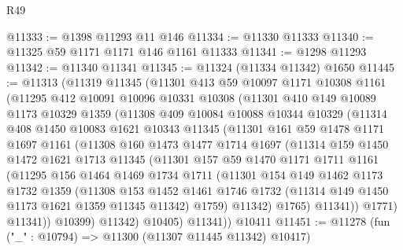 \begin{lexlean}{R49}
\begin{coremodule}
@11333 := @1398 @11293 @11 @146
@11334 := @11330 @11333
@11340 := @11325 @59 @1171 @1171 @146 @1161 @11333
@11341 := @1298 @11293
@11342 := @11340 @11341
@11345 := @11324 (@11334 @11342) @1650
@11445 := @11313
    (@11319
      @11345
      (@11301
        @413
        @59
        @10097
        @1171
        @10308
        @1161
        (@11295
          @412
          @10091
          @10096
          @10331
          @10308
          (@11301
            @410
            @149
            @10089
            @1173
            @10329
            @1359
            (@11308
              @409
              @10084
              @10088
              @10344
              @10329
              (@11314
                @408
                @1450
                @10083
                @1621
                @10343
                @11345
                (@11301
                  @161
                  @59
                  @1478
                  @1171
                  @1697
                  @1161
                  (@11308
                    @160
                    @1473
                    @1477
                    @1714
                    @1697
                    (@11314
                      @159
                      @1450
                      @1472
                      @1621
                      @1713
                      @11345
                      (@11301
                        @157
                        @59
                        @1470
                        @1171
                        @1711
                        @1161
                        (@11295
                          @156
                          @1464
                          @1469
                          @1734
                          @1711
                          (@11301
                            @154
                            @149
                            @1462
                            @1173
                            @1732
                            @1359
                            (@11308
                              @153
                              @1452
                              @1461
                              @1746
                              @1732
                              (@11314 @149 @1450 @1173 @1621 @1359 @11345 @11342)
                              @1759)
                            @11342)
                          @1765)
                        @11341))
                    @1771)
                  @11341))
              @10399)
            @11342)
          @10405)
        @11341))
    @10411
@11451 := @11278 (fun ("_" : @10794) => @11300 (@11307 @11445 @11342) @10417)

\end{coremodule}
\end{lexlean}
